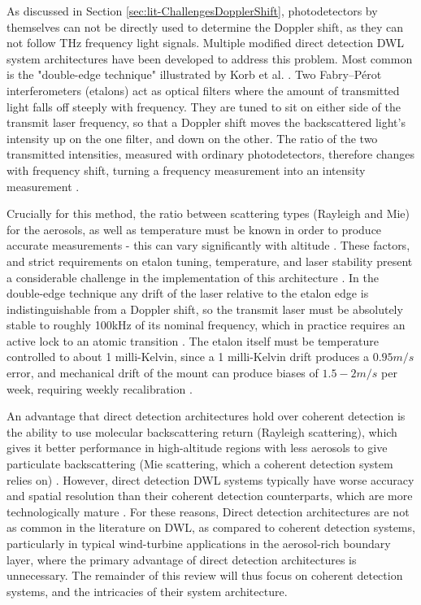        As discussed in Section \ref{sec:lit-ChallengesDopplerShift}, photodetectors by themselves can not be directly used to determine the Doppler shift, as they can not follow THz frequency light signals. Multiple modified direct detection DWL system architectures have been developed to address this problem. Most common is the "double-edge technique" illustrated by Korb et al. \cite{korb_theory_1998}. Two Fabry–Pérot interferometers (etalons) act as optical filters where the amount of transmitted light falls off steeply with frequency. They are tuned to sit on either side of the transmit laser frequency, so that a Doppler shift moves the backscattered light's intensity up on the one filter, and down on the other. The ratio of the two transmitted intensities, measured with ordinary photodetectors, therefore changes with frequency shift, turning a frequency measurement into an intensity measurement \cite{colberg_diode-laser-based_2026}.
       
       Crucially for this method, the ratio between scattering types (Rayleigh and Mie) for the aerosols, as well as temperature must be known in order to produce accurate measurements - this can vary significantly with altitude \cite{werner_doppler_2005}. These factors, and strict requirements on etalon tuning, temperature, and laser stability present a considerable challenge in the implementation of this architecture \cite{colberg_diode-laser-based_2026}. In the double-edge technique any drift of the laser relative to the etalon edge is
        indistinguishable from a Doppler shift, so the transmit laser must be absolutely stable to roughly 100kHz of its nominal frequency, which in practice requires an active lock to an atomic transition \cite{colberg_diode-laser-based_2026}.
        The etalon itself must be temperature controlled to about 1 milli-Kelvin, since a 1 milli-Kelvin
        drift produces a $0.95m/s$ error, and mechanical drift of the mount can produce biases of $1.5-2m/s$ per week, requiring weekly recalibration \cite{colberg_diode-laser-based_2026}.
        
        An advantage that direct detection architectures hold over coherent detection is the ability to use molecular backscattering return (Rayleigh scattering), which gives it better performance in high-altitude regions with less aerosols to give particulate backscattering (Mie scattering, which a coherent detection system relies on) \cite{colberg_diode-laser-based_2026}. However, direct detection DWL systems typically have worse accuracy and spatial resolution than their coherent detection counterparts, which are more technologically mature \cite{werner_doppler_2005}. For these reasons, Direct detection architectures are not as common in the literature on DWL, as compared to coherent detection systems, particularly in typical wind-turbine applications in the aerosol-rich boundary layer, where the primary advantage of direct detection architectures is unnecessary. The remainder of this review will thus focus on coherent detection systems, and the intricacies of their system architecture. 
        

